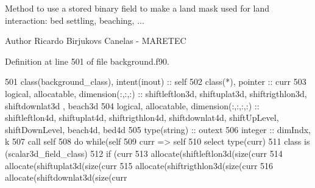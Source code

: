 Method to use a stored binary field to make a land mask used for land interaction\+: bed settling, beaching, ... 

\begin{DoxyAuthor}{Author}
Ricardo Birjukovs Canelas -\/ M\+A\+R\+E\+T\+EC 
\end{DoxyAuthor}


Definition at line 501 of file background.\+f90.


\begin{DoxyCode}
501     \textcolor{keywordtype}{class}(background\_class), \textcolor{keywordtype}{intent(inout)} :: self
502     \textcolor{keywordtype}{class}(*), \textcolor{keywordtype}{pointer} :: curr
503     \textcolor{keywordtype}{logical}, \textcolor{keywordtype}{allocatable}, \textcolor{keywordtype}{dimension(:,:,:)} :: shiftleftlon3d, shiftuplat3d, shiftrigthlon3d, shiftdownlat3d
      , beach3d
504     \textcolor{keywordtype}{logical}, \textcolor{keywordtype}{allocatable}, \textcolor{keywordtype}{dimension(:,:,:,:)} :: shiftleftlon4d, shiftuplat4d, shiftrigthlon4d, 
      shiftdownlat4d, shiftUpLevel, shiftDownLevel, beach4d, bed4d
505     \textcolor{keywordtype}{type}(string) :: outext
506     \textcolor{keywordtype}{integer} :: dimIndx, k
507     \textcolor{keyword}{call }self%
508     \textcolor{keywordflow}{do} \textcolor{keywordflow}{while}(self%
509         curr => self%
510         \textcolor{keywordflow}{select type}(curr)
511 \textcolor{keywordflow}{        class is} (scalar3d\_field\_class)
512             \textcolor{keywordflow}{if} (curr%
513                 \textcolor{keyword}{allocate}(shiftleftlon3d(\textcolor{keyword}{size}(curr%
514                 \textcolor{keyword}{allocate}(shiftuplat3d(\textcolor{keyword}{size}(curr%
515                 \textcolor{keyword}{allocate}(shiftrigthlon3d(\textcolor{keyword}{size}(curr%
516                 \textcolor{keyword}{allocate}(shiftdownlat3d(\textcolor{keyword}{size}(curr%

\end{DoxyCode}
